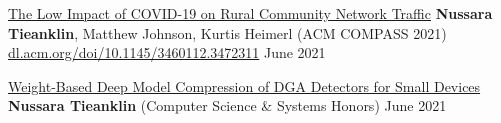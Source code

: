 \begin{cventries}

  \cvpub
    {\href{https://dl.acm.org/doi/10.1145/3460112.3472311}{The Low Impact of COVID-19 on Rural Community Network Traffic}} %
    {\textbf{Nussara Tieanklin}, Matthew Johnson, Kurtis Heimerl (ACM COMPASS 2021)}
    {\href{https://dl.acm.org/doi/10.1145/3460112.3472311}{dl.acm.org/doi/10.1145/3460112.3472311}} %
    {June 2021} %

    \cvpub
        {\href{https://www.tacoma.uw.edu/sites/default/files/2021-08/tieanklin_nussara_senior_thesis-2021.pdf}{Weight-Based Deep Model Compression of DGA Detectors for Small Devices}} %
        {\textbf{Nussara Tieanklin} (Computer Science \& Systems Honors)} 
        {} %
        {June 2021} %
\end{cventries}
